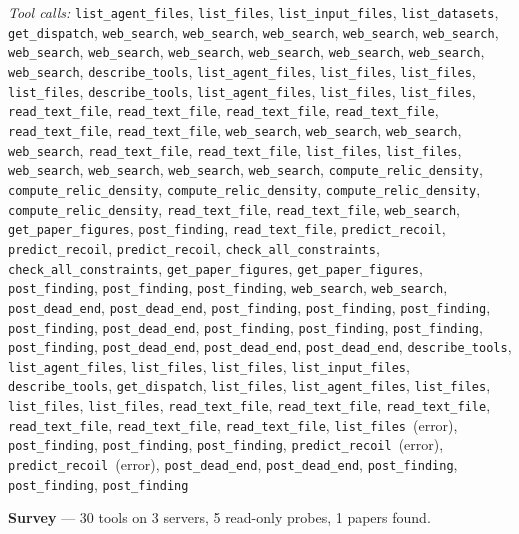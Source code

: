 \documentclass[11pt,a4paper]{article}
\begin{document}
\textit{Tool calls:} \texttt{list\_agent\_files}, \texttt{list\_files}, \texttt{list\_input\_files}, \texttt{list\_datasets}, \texttt{get\_dispatch}, \texttt{web\_search}, \texttt{web\_search}, \texttt{web\_search}, \texttt{web\_search}, \texttt{web\_search}, \texttt{web\_search}, \texttt{web\_search}, \texttt{web\_search}, \texttt{web\_search}, \texttt{web\_search}, \texttt{web\_search}, \texttt{web\_search}, \texttt{describe\_tools}, \texttt{list\_agent\_files}, \texttt{list\_files}, \texttt{list\_files}, \texttt{list\_files}, \texttt{describe\_tools}, \texttt{list\_agent\_files}, \texttt{list\_files}, \texttt{list\_files}, \texttt{read\_text\_file}, \texttt{read\_text\_file}, \texttt{read\_text\_file}, \texttt{read\_text\_file}, \texttt{read\_text\_file}, \texttt{read\_text\_file}, \texttt{web\_search}, \texttt{web\_search}, \texttt{web\_search}, \texttt{web\_search}, \texttt{read\_text\_file}, \texttt{read\_text\_file}, \texttt{list\_files}, \texttt{list\_files}, \texttt{web\_search}, \texttt{web\_search}, \texttt{web\_search}, \texttt{web\_search}, \texttt{compute\_relic\_density}, \texttt{compute\_relic\_density}, \texttt{compute\_relic\_density}, \texttt{compute\_relic\_density}, \texttt{compute\_relic\_density}, \texttt{read\_text\_file}, \texttt{read\_text\_file}, \texttt{web\_search}, \texttt{get\_paper\_figures}, \texttt{post\_finding}, \texttt{read\_text\_file}, \texttt{predict\_recoil}, \texttt{predict\_recoil}, \texttt{predict\_recoil}, \texttt{check\_all\_constraints}, \texttt{check\_all\_constraints}, \texttt{get\_paper\_figures}, \texttt{get\_paper\_figures}, \texttt{post\_finding}, \texttt{post\_finding}, \texttt{post\_finding}, \texttt{web\_search}, \texttt{web\_search}, \texttt{post\_dead\_end}, \texttt{post\_dead\_end}, \texttt{post\_finding}, \texttt{post\_finding}, \texttt{post\_finding}, \texttt{post\_finding}, \texttt{post\_dead\_end}, \texttt{post\_finding}, \texttt{post\_finding}, \texttt{post\_finding}, \texttt{post\_finding}, \texttt{post\_dead\_end}, \texttt{post\_dead\_end}, \texttt{post\_dead\_end}, \texttt{describe\_tools}, \texttt{list\_agent\_files}, \texttt{list\_files}, \texttt{list\_files}, \texttt{list\_input\_files}, \texttt{describe\_tools}, \texttt{get\_dispatch}, \texttt{list\_files}, \texttt{list\_agent\_files}, \texttt{list\_files}, \texttt{list\_files}, \texttt{list\_files}, \texttt{read\_text\_file}, \texttt{read\_text\_file}, \texttt{read\_text\_file}, \texttt{read\_text\_file}, \texttt{read\_text\_file}, \texttt{read\_text\_file}, \texttt{list\_files}~(error), \texttt{post\_finding}, \texttt{post\_finding}, \texttt{post\_finding}, \texttt{predict\_recoil}~(error), \texttt{predict\_recoil}~(error), \texttt{post\_dead\_end}, \texttt{post\_dead\_end}, \texttt{post\_finding}, \texttt{post\_finding}, \texttt{post\_finding}\par
\textbf{Survey} --- 30 tools on 3 servers, 5 read-only probes, 1 papers found.
\end{document}
